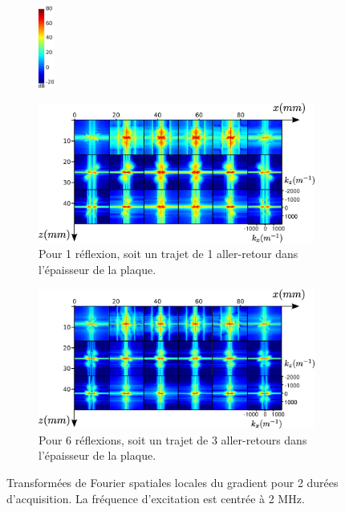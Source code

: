 \begin{figure}[!h]
    \centering
    \begin{subfigure}[b]{0.05\textwidth}
 		\hspace{-2cm}\includegraphics[width=0.5cm]{img/echelle_fft.png}\vspace{2.1cm}
	\end{subfigure}
    \begin{subfigure}[b]{0.4\textwidth}
		\hspace{-3cm}\includegraphics[width=1.5\textwidth]{img/1400pt.png}
		\caption{Pour 1 réflexion, soit un trajet de 1 aller-retour dans l'épaisseur de la plaque.}
		\label{app:1400pt}
	\end{subfigure}	
	\hspace{0.7cm}
	\begin{subfigure}[b]{0.4\textwidth}
		\hspace{-0.7cm}\includegraphics[width=1.5\textwidth]{img/4200pt.png}
		\caption{Pour 6 réflexions, soit un trajet de 3 aller-retours dans l'épaisseur de la plaque.}
		\label{app:4200pt}
	\end{subfigure}
	\caption{Transformées de Fourier spatiales locales du gradient pour 2 durées d'acquisition. La fréquence d'excitation est centrée à 2 MHz.}
\end{figure}

